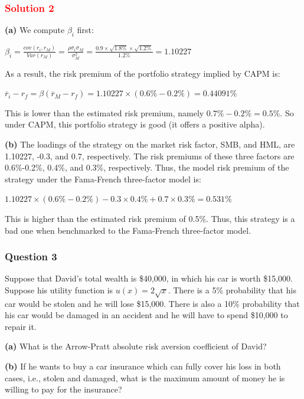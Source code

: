 \subsubsection*{\textcolor{red}{Solution 2}}

\textbf{(a)} We compute $\beta_{i}$ first:

\centerline{$\beta_{i} = \frac{cov(r_{i}, r_{M})}{Var(r_{M})} = \frac{\rho\sigma_{i}\sigma_{M}}{\sigma_{M}^{2}} = \frac{0.9 \times \sqrt{1.8\%} \times \sqrt{1.2\%}}{1.2\%} = 1.10227$}

As a result, the risk premium of the portfolio strategy implied by CAPM is:

\centerline{$\overline{r}_{i} - r_{f} = \beta(\overline{r}_{M} - r_{f}) = 1.10227 \times (0.6\% - 0.2\%) = 0.44091\%$}

This is lower than the estimated risk premium, namely $0.7\% - 0.2\% = 0.5\%$. So under CAPM, this portfolio strategy is good (it offers a positive alpha).

\textbf{(b)} The loadings of the strategy on the market risk factor, SMB, and HML, are 1.10227, -0.3, and 0.7, respectively. The risk premiums of these three factors are 0.6\%-0.2\%, 0.4\%, and 0.3\%, respectively. Thus, the model risk premium of the strategy under the Fama-French three-factor model is:

\centerline{$1.10227 \times (0.6\% - 0.2\%) - 0.3 \times 0.4\% + 0.7 \times 0.3\% = 0.531\%$}

This is higher than the estimated risk premium of 0.5\%. Thus, this strategy is a bad one when benchmarked to the Fama-French three-factor model.

\subsubsection*{Question 3}

Suppose that David's total wealth is \$40,000, in which his car is worth \$15,000. Suppose his utility function is $u(x)=2\sqrt{x}$. There is a 5\% probability that his car would be stolen and he will lose \$15,000. There is also a 10\% probability that his car would be damaged in an accident and he will have to spend \$10,000 to repair it.

\textbf{(a)} What is the Arrow-Pratt absolute risk aversion coefficient of David?

\textbf{(b)} If he wants to buy a car insurance which can fully cover his loss in both cases, i.e., stolen and damaged, what is the maximum amount of money he is willing to pay for the insurance?

